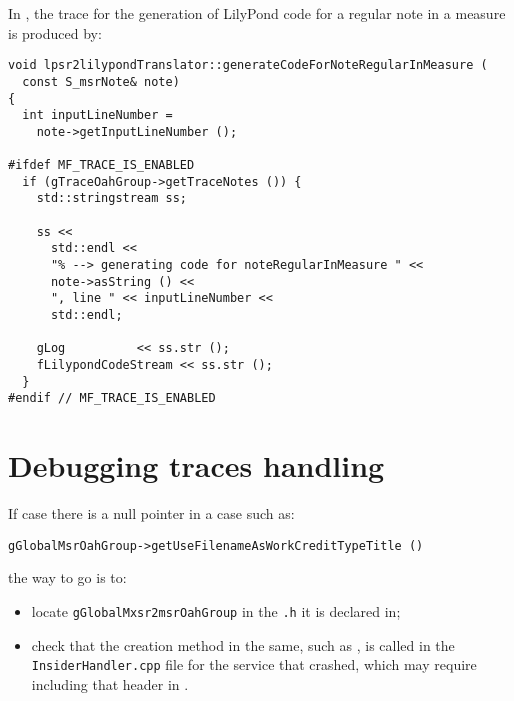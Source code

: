 In , the trace for the generation of LilyPond code for a regular note in a measure is produced by:
\begin{lstlisting}[language=CPlusPlus]
void lpsr2lilypondTranslator::generateCodeForNoteRegularInMeasure (
  const S_msrNote& note)
{
  int inputLineNumber =
    note->getInputLineNumber ();

#ifdef MF_TRACE_IS_ENABLED
  if (gTraceOahGroup->getTraceNotes ()) {
    std::stringstream ss;

    ss <<
      std::endl <<
      "% --> generating code for noteRegularInMeasure " <<
      note->asString () <<
      ", line " << inputLineNumber <<
      std::endl;

    gLog          << ss.str ();
    fLilypondCodeStream << ss.str ();
  }
#endif // MF_TRACE_IS_ENABLED

\end{lstlisting}


\section{Debugging traces handling}

If case there is a null pointer in a case such as:
\begin{lstlisting}[language=CPlusPlus]
    gGlobalMsrOahGroup->getUseFilenameAsWorkCreditTypeTitle ()
\end{lstlisting}

the way to go is to:%
\begin{itemize}
\item locate {\tt gGlobalMxsr2msrOahGroup} in the {\tt *.h} it is declared in;
\item check that the creation method in the same, such as , is called in the {\tt *InsiderHandler.cpp} file for the service that crashed, which may require including that  header in .
\end{itemize}

